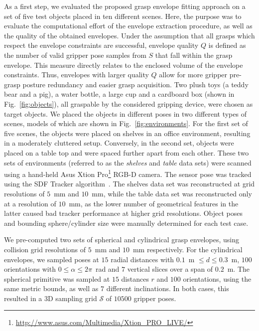 As a first step, we evaluated the proposed grasp envelope fitting approach on a set of five test
objects placed in ten different scenes. Here, the purpose was to evaluate the computational effort
of the envelope extraction procedure, as well as the quality of the obtained envelopes. Under the assumption
that all grasps which respect the envelope constraints are successful, envelope quality $Q$ is
defined as the number of valid gripper pose samples from $S$ that fall within the grasp envelope. This measure
directly relates to the enclosed volume of the envelope constraints. Thus, envelopes with larger
quality $Q$ allow for more gripper pre-grasp posture redundancy and easier grasp acquisition. Two plush toys (a teddy bear and a pig), a water bottle, a large cup and a cardboard box (shown in
Fig.~\ref{fig:objects}), all graspable by the considered gripping device, were chosen as target objects.
We placed the objects in different poses in two different types of scenes, models of which are shown in Fig.~\ref{fig:environments}. 
For the first set of five scenes, the objects were placed on shelves in an office environment, resulting in a moderately cluttered setup.
Conversely, in the second set, objects were placed on a table top and were spaced further apart from each other.
These two sets of environments (referred to as the \textit{shelves} and \textit{table} data sets) were scanned using a hand-held Asus Xtion Pro\footnote{\url{http://www.asus.com/Multimedia/Xtion_PRO_LIVE/}} RGB-D camera.
The sensor pose was tracked using the SDF Tracker algorithm~\cite{Cane13a}.
The shelves data set was reconstructed at grid resolutions of $5$~mm and $10$~mm, while the table data set was reconstructed only at a resolution of $10$~mm, as the lower number of geometrical features in the latter caused bad tracker performance at higher grid resolutions.
Object poses and bounding sphere/cylinder size were manually determined for each test case.
\par
We pre-computed two sets of spherical and cylindrical grasp envelopes, using collision grid resolutions of $5$~mm and $10$~mm respectively.
For the cylindrical envelopes, we sampled poses at $15$ radial distances with $0.1$~m $\leq d \leq 0.3$~m, $100$ orientations with $0\leq \alpha \leq 2\pi$~rad and $7$ vertical slices over a span of $0.2$~m.
The spherical primitive was sampled at $15$ distances $r$ and $100$ orientations, using the same metric bounds, as well as $7$ different inclinations.
In both cases, this resulted in a 3D sampling grid $\mathcal{S}$ of $10500$ gripper poses.
